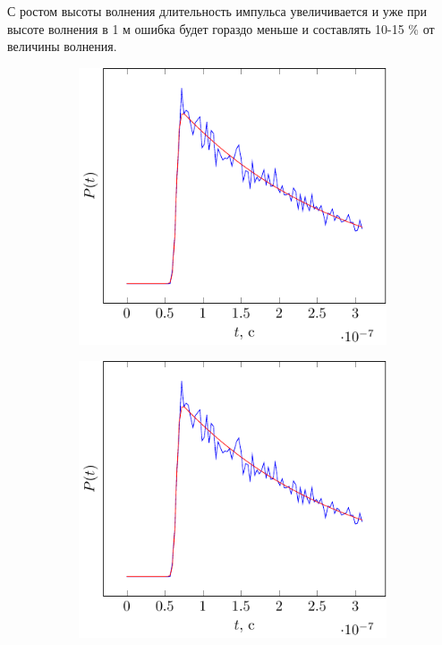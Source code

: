 С ростом высоты волнения длительность импульса увеличивается и уже
при высоте волнения в 1 м ошибка будет гораздо меньше и составлять 10-15 \%
от величины волнения.


\begin{figure}[H]
    \centering
    \begin{subfigure}{0.49\linewidth}
        \centering
        \includegraphics[width=\linewidth,page=1]{fig/retracking/model}
    \end{subfigure}
    \begin{subfigure}{0.49\linewidth}
        \centering
        \includegraphics[width=\linewidth,page=3]{fig/retracking/model}

\end{subfigure}
\end{figure}
